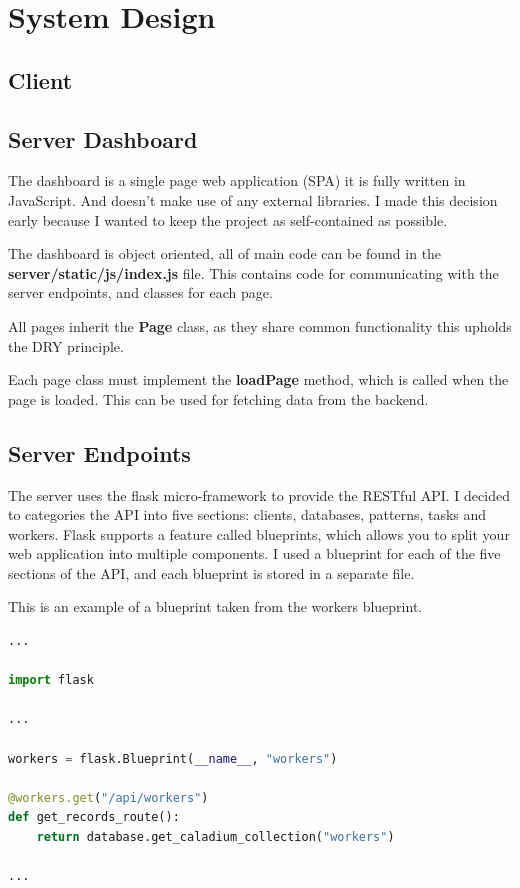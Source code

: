 \chapter{System Design}


\section{Client}


\section{Server Dashboard}
The dashboard is a single page web application (SPA) it is fully written in JavaScript.
And doesn't make use of any external libraries.
I made this decision early because I wanted to keep the project as self-contained as possible.

The dashboard is object oriented, all of main code can be found in the \textbf{server/static/js/index.js} file.
This contains code for communicating with the server endpoints, and classes for each page.

All pages inherit the \textbf{Page} class, as they share common functionality this upholds the DRY principle.


Each page class must implement the \textbf{loadPage} method, which is called when the page is loaded.
This can be used for fetching data from the backend.



\section{Server Endpoints}
The server uses the flask micro-framework to provide the RESTful API.
I decided to categories the API into five sections: clients, databases, patterns, tasks and workers.
Flask supports a feature called blueprints, which allows you to split your web application into multiple components.
I used a blueprint for each of the five sections of the API, and each blueprint is stored in a separate file.

This is an example of a blueprint taken from the workers blueprint.
\begin{lstlisting}[language=python]
...

import flask

...

workers = flask.Blueprint(__name__, "workers")

@workers.get("/api/workers")
def get_records_route():
    return database.get_caladium_collection("workers")

...
\end{lstlisting}

